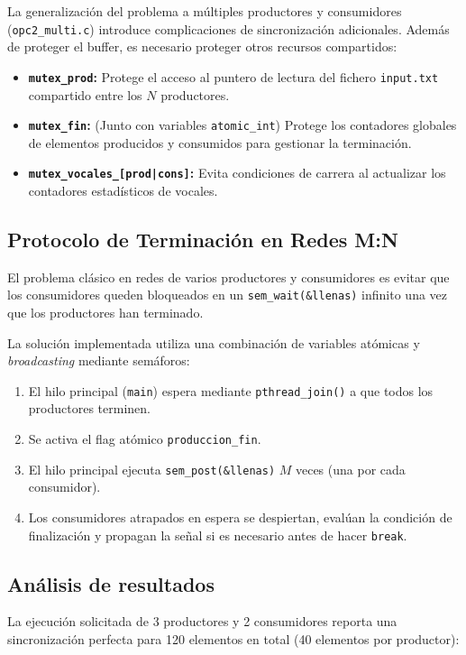 \documentclass[a4paper, 12pt]{article}
\newcommand{\ic}[1]{\texttt{#1}}
\begin{document}
La generalización del problema a múltiples productores y consumidores (\ic{opc2\_multi.c}) introduce complicaciones de sincronización adicionales. Además de proteger el buffer, es necesario proteger otros recursos compartidos:

\begin{itemize}
    \item \textbf{\ic{mutex\_prod}:} Protege el acceso al puntero de lectura del fichero \ic{input.txt} compartido entre los $N$ productores.
    \item \textbf{\ic{mutex\_fin}:} (Junto con variables \ic{atomic\_int}) Protege los contadores globales de elementos producidos y consumidos para gestionar la terminación.
    \item \textbf{\ic{mutex\_vocales\_[prod|cons]}:} Evita condiciones de carrera al actualizar los contadores estadísticos de vocales.
\end{itemize}

\subsection{Protocolo de Terminación en Redes M:N}

El problema clásico en redes de varios productores y consumidores es evitar que los consumidores queden bloqueados en un \ic{sem\_wait(\&llenas)} infinito una vez que los productores han terminado.

La solución implementada utiliza una combinación de variables atómicas y \emph{broadcasting} mediante semáforos:
\begin{enumerate}
    \item El hilo principal (\ic{main}) espera mediante \ic{pthread\_join()} a que todos los productores terminen.
    \item Se activa el flag atómico \ic{produccion\_fin}.
    \item El hilo principal ejecuta \ic{sem\_post(\&llenas)} $M$ veces (una por cada consumidor).
    \item Los consumidores atrapados en espera se despiertan, evalúan la condición de finalización y propagan la señal si es necesario antes de hacer \ic{break}.
\end{enumerate}

\subsection{Análisis de resultados}

La ejecución solicitada de 3 productores y 2 consumidores reporta una sincronización perfecta para 120 elementos en total (40 elementos por productor):
\end{document}
